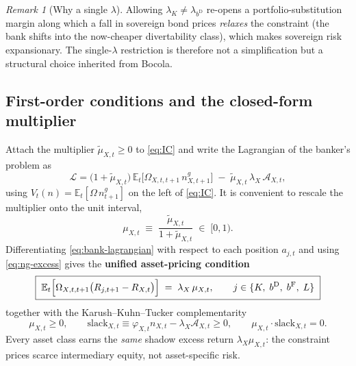 \documentclass[11pt]{article}
\numberwithin{equation}{section}
\newcommand{\E}{\mathbb{E}}
\newcommand{\D}{\mathrm{D}}
\newcommand{\F}{\mathrm{F}}
\theoremstyle{definition}
\theoremstyle{plain}
\theoremstyle{remark}
\newtheorem{remark}{Remark}
\begin{document}
\begin{remark}[Why a single $\lambda$]
Allowing $\lambda_K\ne\lambda_{b^{\D}}$ re-opens a portfolio-substitution margin
along which a fall in sovereign bond prices \emph{relaxes} the constraint (the bank
shifts into the now-cheaper divertability class), which makes sovereign risk
expansionary. The single-$\lambda$ restriction is therefore not a simplification but
a structural choice inherited from Bocola.
\end{remark}

\subsection{First-order conditions and the closed-form multiplier}

Attach the multiplier $\tilde\mu_{X,t}\ge0$ to \eqref{eq:IC} and write the
Lagrangian of the banker's problem as
\begin{equation}
\mathcal{L}
=\bigl(1+\tilde\mu_{X,t}\bigr)\,
  \E_t\bigl[\Omega_{X,t,t+1}\,n^{g}_{X,t+1}\bigr]
  \;-\;\tilde\mu_{X,t}\,\lambda_X\,\mathcal{A}_{X,t},
\label{eq:bank-lagrangian}
\end{equation}
using $V_t(n)=\E_t[\Omega\,n^{g}_{t+1}]$ on the left of \eqref{eq:IC}. It is
convenient to rescale the multiplier onto the unit interval,
\begin{equation}
\mu_{X,t}\;\equiv\;\frac{\tilde\mu_{X,t}}{1+\tilde\mu_{X,t}}\;\in\;[0,1).
\label{eq:mu-rescale}
\end{equation}
Differentiating \eqref{eq:bank-lagrangian} with respect to each position $a_{j,t}$
and using \eqref{eq:ng-excess} gives the \textbf{unified asset-pricing condition}
\begin{equation}
\boxed{\;\E_t\Bigl[\Omega_{X,t,t+1}\bigl(R_{j,t+1}-R_{X,t}\bigr)\Bigr]
\;=\;\lambda_X\,\mu_{X,t},
\qquad j\in\{K,\;b^{\D},\;b^{\F},\;L\}\;}
\label{eq:foc-general}
\end{equation}
together with the Karush--Kuhn--Tucker complementarity
\begin{equation}
\mu_{X,t}\ge0,
\qquad
\mathrm{slack}_{X,t}\equiv\varphi_{X,t}n_{X,t}-\lambda_X\mathcal{A}_{X,t}\ge0,
\qquad
\mu_{X,t}\cdot\mathrm{slack}_{X,t}=0 .
\label{eq:kkt}
\end{equation}
Every asset class earns the \emph{same} shadow excess return $\lambda_X\mu_{X,t}$:
the constraint prices scarce intermediary equity, not asset-specific risk.
\end{document}
